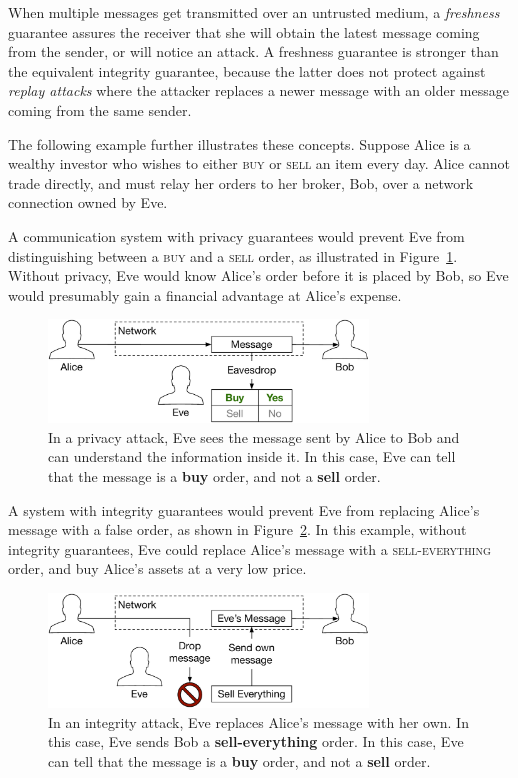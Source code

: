 When multiple messages get transmitted over an untrusted medium, a
\textit{freshness} guarantee assures the receiver that she will obtain the
latest message coming from the sender, or will notice an attack. A freshness
guarantee is stronger than the equivalent integrity guarantee, because the
latter does not protect against \textit{replay attacks} where the attacker
replaces a newer message with an older message coming from the same sender.

The following example further illustrates these concepts. Suppose Alice is a
wealthy investor who wishes to either \textsc{buy} or \textsc{sell} an item
every day. Alice cannot trade directly, and must relay her orders to her
broker, Bob, over a network connection owned by Eve.

A communication system with privacy guarantees would prevent Eve from
distinguishing between a \textsc{buy} and a \textsc{sell} order, as illustrated
in Figure~\ref{fig:privacy_attack}. Without privacy, Eve would know Alice's
order before it is placed by Bob, so Eve would presumably gain a financial
advantage at Alice's expense.

\begin{figure}[hbt]
  \centering
  \includegraphics[width=85mm]{figures/privacy_attack.pdf}
  \caption{
    In a privacy attack, Eve sees the message sent by Alice to Bob and can
    understand the information inside it. In this case, Eve can tell that the
    message is a \textbf{buy} order, and not a \textbf{sell} order.
  }
  \label{fig:privacy_attack}
\end{figure}

A system with integrity guarantees would prevent Eve from replacing Alice's
message with a false order, as shown in Figure~\ref{fig:integrity_attack}. In
this example, without integrity guarantees, Eve could replace Alice's message
with a \textsc{sell-everything} order, and buy Alice's assets at a very low
price.

\begin{figure}[hbt]
  \centering
  \includegraphics[width=85mm]{figures/integrity_attack.pdf}
  \caption{
    In an integrity attack, Eve replaces Alice's message with her own. In this
    case, Eve sends Bob a \textbf{sell-everything} order. In this case, Eve can
    tell that the message is a \textbf{buy} order, and not a \textbf{sell}
    order.
  }
  \label{fig:integrity_attack}
\end{figure}

